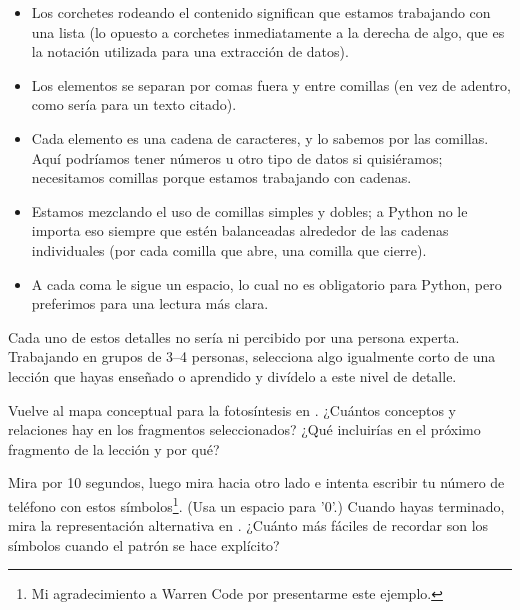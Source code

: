 \begin{itemize}

\item
  Los corchetes rodeando el contenido significan que estamos trabajando con una lista
  (lo opuesto a corchetes inmediatamente a la derecha de algo,
  que es la notación utilizada para una extracción de datos).

\item
  Los elementos se separan por comas fuera y entre comillas
  (en vez de adentro, como sería para un texto citado).

\item
  Cada elemento es una cadena de caracteres,
  y lo sabemos por las comillas.
  Aquí podríamos tener números u otro tipo de datos si quisiéramos;
  necesitamos comillas porque estamos trabajando con cadenas.

\item
  Estamos mezclando el uso de comillas simples y dobles;
  a Python no le importa eso siempre que estén balanceadas alrededor de las cadenas individuales (por cada comilla que abre, una comilla que cierre).

\item
  A cada coma le sigue un espacio,
  lo cual no es obligatorio para Python,
  pero preferimos para una lectura más clara.

\end{itemize}

Cada uno de estos detalles no sería ni percibido por una persona experta.
Trabajando en grupos de  3--4 personas,
selecciona algo igualmente corto de una lección que hayas enseñado o aprendido
y divídelo a este nivel de detalle.


Vuelve al mapa conceptual para la fotosíntesis en .
¿Cuántos conceptos y relaciones hay en los fragmentos seleccionados?
¿Qué incluirías en el próximo fragmento de la lección y por qué?


Mira  por 10 segundos,
luego mira hacia otro lado e intenta escribir tu número de teléfono con estos símbolos\footnote{
  Mi agradecimiento a Warren Code por presentarme este ejemplo.
}.
(Usa un espacio para '0'.)
Cuando hayas terminado,
mira la representación alternativa en .
¿Cuánto más fáciles de recordar son los símbolos cuando el patrón se hace explícito?

